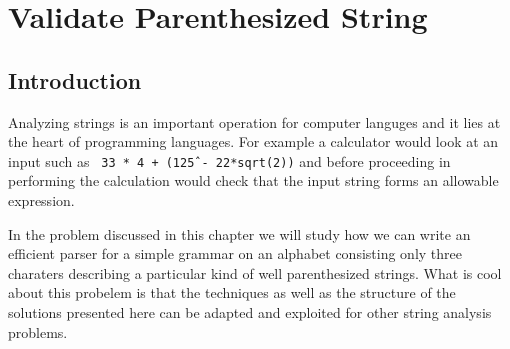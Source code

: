 
\chapter{Validate Parenthesized String}
\label{ch:valid_parenthesis}

\section*{Introduction}
Analyzing strings is an important operation for computer languges and it lies at the heart of programming languages. 
For example a calculator would look at an input such as 
\texttt{ 33 * 4  + (12\^5 - 22*sqrt(2))} and before proceeding in performing the calculation would check that the input string forms an allowable expression. 

In the problem discussed in this chapter we will study how we can write an efficient parser for a simple grammar on an alphabet consisting only three charaters describing a particular kind of well parenthesized strings.
What is cool about this probelem is that the techniques as well as the structure of the solutions presented here can be adapted and exploited for other string analysis problems. 




